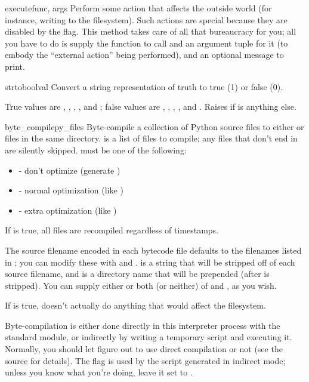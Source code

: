 \documentclass{manual}
\begin{document}
\begin{funcdesc}{execute}{func, args}
Perform some action that affects the outside world (for instance,
writing to the filesystem).  Such actions are special because they
are disabled by the  flag.  This method takes 
care of all that bureaucracy for you; all you have to do is supply the
function to call and an argument tuple for it (to embody the
``external action'' being performed), and an optional message to
print.
\end{funcdesc}

\begin{funcdesc}{strtobool}{val}
Convert a string representation of truth to true (1) or false (0).

True values are , , , ,  
and ; false values are , , , , 
 and .  Raises  if  
is anything else.
\end{funcdesc}

\begin{funcdesc}{byte_compile}{py_files}
Byte-compile a collection of Python source files to either 
or  files in the same directory.   is a list of files
to compile; any files that don't end in  are silently skipped.
 must be one of the following:
\begin{itemize}
\item {} - don't optimize (generate )
\item {} - normal optimization (like )
\item {} - extra optimization (like )
\end{itemize}

If  is true, all files are recompiled regardless of
timestamps.

The source filename encoded in each bytecode file defaults to the
filenames listed in ; you can modify these with  and
.   is a string that will be stripped off of each
source filename, and  is a directory name that will be
prepended (after  is stripped).  You can supply either or both
(or neither) of  and , as you wish.

If  is true, doesn't actually do anything that would
affect the filesystem.

Byte-compilation is either done directly in this interpreter process
with the standard  module, or indirectly by writing a
temporary script and executing it.  Normally, you should let
 figure out to use direct compilation or not (see
the source for details).  The  flag is used by the script
generated in indirect mode; unless you know what you're doing, leave
it set to .
\end{funcdesc}
\end{document}

